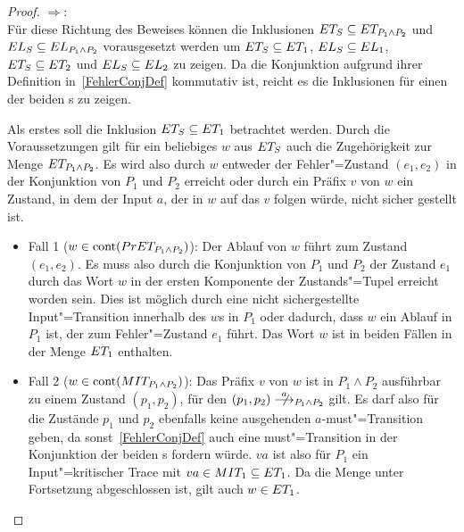 \begin{proof}
  \glqq $\Rightarrow$\grqq{}:\\
  Für diese Richtung des Beweises können die Inklusionen $ET _S\subseteq ET
  _{P_1\land P_2}$ und $EL _S\subseteq EL _{P_1\land P_2}$ vorausgesetzt
  werden um $ET _S\subseteq ET _1$, $EL _S\subseteq EL _1$, $ET
  _S\subseteq ET _2$ und $EL _S\subseteq EL _2$ zu zeigen. Da die
  Konjunktion aufgrund ihrer Definition in~\ref{FehlerConjDef} kommutativ ist, reicht
  es die Inklusionen für einen der beiden \MEIO{}s zu zeigen.

  Als erstes soll die Inklusion $ET _S\subseteq ET _1$ betrachtet werden.
  Durch die Voraussetzungen gilt für ein beliebiges $w$ aus $ET _S$ auch die
  Zugehörigkeit zur Menge $ET _{P_1\land P_2}$. Es wird also durch $w$
  entweder der Fehler"=Zustand $(e_1,e_2)$ in der Konjunktion von $P_1$ und
  $P_2$ erreicht oder durch ein Präfix $v$ von $w$ ein Zustand, in dem der
  Input $a$, der in $w$ auf das $v$ folgen würde, nicht sicher gestellt ist.
  \begin{itemize}
    \item Fall 1 ($w\in\mathrm{cont} (PrET _{P_1\land P_2})$): Der Ablauf von $w$
      führt zum Zustand $(e_1,e_2)$. Es muss also durch die Konjunktion von
      $P_1$ und $P_2$ der Zustand $e_1$ durch das Wort $w$ in der ersten
      Komponente der Zustands"=Tupel erreicht worden sein. Dies ist möglich
      durch eine nicht sichergestellte Input"=Transition innerhalb des $w$s in
      $P_1$ oder dadurch, dass $w$ ein Ablauf in $P_1$ ist, der zum
      Fehler"=Zustand $e_1$ führt. Das Wort $w$ ist in beiden Fällen in der
      Menge $ET _1$ enthalten.
    \item Fall 2 ($w\in\mathrm{cont} (MIT _{P_1\land P_2})$): Das Präfix $v$ von $w$
      ist in $P_1\land P_2$ ausführbar zu einem Zustand $(p_1,p_2)$, für den
      $(p_1,p_2)\nmust[a]_{P_1\land P_2}$ gilt. Es darf also für die Zustände
      $p_1$ und $p_2$ ebenfalls keine ausgehenden $a$-must"=Transition geben,
      da sonst~\ref{FehlerConjDef} auch eine must"=Transition in der Konjunktion der
      beiden \MEIO{}s fordern würde. $va$ ist also für $P_1$ ein
      Input"=kritischer Trace mit $va\in MIT _1\subseteq ET _1$. Da die Menge
      \ET{} unter Fortsetzung abgeschlossen ist, gilt auch $w\in ET _1$.
  \end{itemize}


\end{proof}
